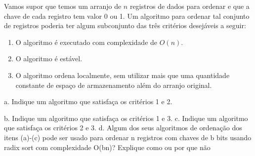 \documentclass{article}
\begin{document}
Vamos supor que temos um arranjo de $n$ registros de dados para ordenar e que a chave de cada 
registro tem valor 0 ou 1. Um algoritmo para ordenar tal conjunto de registros poderia ter algum subconjunto 
das três critérios desejáveis a seguir:
\begin{enumerate}
    \item O algoritmo é executado com complexidade de $O(n)$.
    \item O algoritmo é estável.
    \item O algoritmo ordena localmente, sem utilizar mais que uma quantidade constante de espaço de armazenamento além do arranjo original.
\end{enumerate}

a. Indique um algoritmo que satisfaça os critérios 1 e 2.




b. Indique um algoritmo que satisfaça os critérios 1 e 3.
c. Indique um algoritmo que satisfaça os critérios 2 e 3.
d. Algum dos seus algoritmos de ordenação dos itens (a)-(c) pode ser usado para ordenar n registros com
chaves de b bits usando radix sort com complexidade O(bn)? Explique como ou por que não
\end{document}
